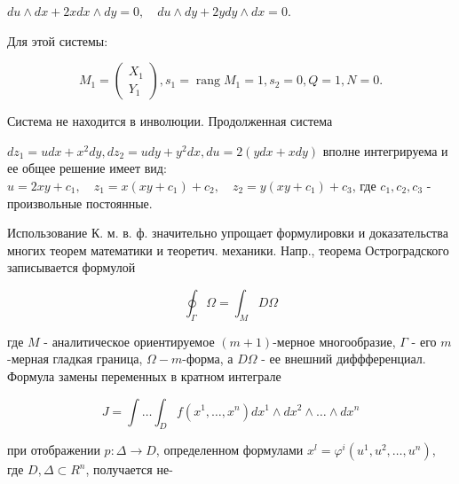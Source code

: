 \documentclass[10pt]{article}
\begin{document}
$d u \wedge d x+2 x d x \wedge d y=0, \quad d u \wedge d y+2 y d y \wedge d x=0$.



Для этой системы:



\[

M_{1}=\left(\begin{array}{l}

X_{1} \\

Y_{1}

\end{array}\right), s_{1}=\operatorname{rang} M_{1}=1, s_{2}=0, Q=1, N=0 .

\]



Система не находится в инволюции. Продолженная система



$d z_{1}=u d x+x^{2} d y, d z_{2}=u d y+y^{2} d x, d u=2(y d x+x d y)$ вполне интегрируема и ее общее решение имеет вид: $u=2 x y+c_{1}, \quad z_{1}=x\left(x y+c_{1}\right)+c_{2}, \quad z_{2}=y\left(x y+c_{1}\right)+c_{3}$, где $c_{1}, c_{2}, c_{3}$ - произвольные постоянные.



Использование К. м. в. ф. значительно упрощает формулировки и доказательства многих теорем математики и теоретич. механики. Напр., теорема Остроградского записывается формулой



\[

\oint_{\Gamma} \Omega=\int_{M} D \Omega

\]



где $M$ - аналитическое ориентируемое $(m+1)$-мерное многообразие, $\Gamma$ - его $m$-мерная гладкая граница, $\Omega-m$-форма, а $D \Omega$ - ее внешний диффференциал. Формула замены переменных в кратном интеграле



\[

J=\int \ldots \int_{D} f\left(x^{1}, \ldots, x^{n}\right) d x^{1} \wedge d x^{2} \wedge \ldots \wedge d x^{n}

\]



при отображении $p: \Delta \rightarrow D$, определенном формулами $x^{l}=\varphi^{i}\left(u^{1}, u^{2}, \ldots, u^{n}\right)$, где $D, \Delta \subset R^{n}$, получается не-
\end{document}

